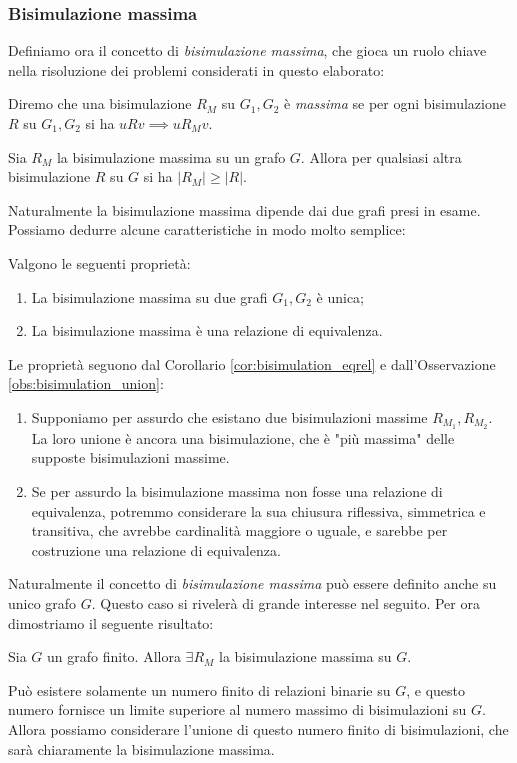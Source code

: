 \subsubsection{Bisimulazione massima}
\label{sec:bisi_max}
Definiamo ora il concetto di \emph{bisimulazione massima}, che gioca un ruolo chiave nella risoluzione dei problemi considerati in questo elaborato:
\begin{definition}
    Diremo che una bisimulazione $R_M$ su $G_1, G_2$ è \emph{massima} se per ogni bisimulazione $R$ su $G_1,G_2$ si ha $u R v \implies u R_M v$.
\end{definition}
\begin{observation}
    Sia $R_M$ la bisimulazione massima su un grafo $G$. Allora per qualsiasi altra bisimulazione $R$ su $G$ si ha $|R_M| \geq |R|$.
\end{observation}
Naturalmente la bisimulazione massima dipende dai due grafi presi in esame. Possiamo dedurre alcune caratteristiche in modo molto semplice:
\begin{proposition}
    Valgono le seguenti proprietà:
    \begin{enumerate}
        \item La bisimulazione massima su due grafi $G_1,G_2$ è unica;
        \item La bisimulazione massima è una relazione di equivalenza.
    \end{enumerate}
    \vspace*{-0.3cm}
    \label{prop:bisi_max_equi}
\end{proposition}
\begin{proof2}
    Le proprietà seguono dal Corollario \ref{cor:bisimulation_eqrel} e dall'Osservazione \ref{obs:bisimulation_union}:
    \begin{enumerate}
        \item Supponiamo per assurdo che esistano due bisimulazioni massime $R_{M_1}, R_{M_2}$. La loro unione è ancora una bisimulazione, che è "più massima" delle supposte bisimulazioni massime.
        \item Se per assurdo la bisimulazione massima non fosse una relazione di equivalenza, potremmo considerare la sua chiusura riflessiva, simmetrica e transitiva, che avrebbe cardinalità maggiore o uguale, e sarebbe per costruzione una relazione di equivalenza.
    \end{enumerate}
    \vspace*{-0.7cm}
\end{proof2}
Naturalmente il concetto di \emph{bisimulazione massima} può essere definito anche su unico grafo $G$. Questo caso si rivelerà di grande interesse nel seguito. Per
ora dimostriamo il seguente risultato:
\begin{theorem}
    Sia $G$ un grafo finito. Allora $\exists R_M$ la bisimulazione massima su $G$.
\end{theorem}
\begin{proof2}
    Può esistere solamente un numero finito di relazioni binarie su $G$, e questo numero fornisce un limite superiore al numero massimo di bisimulazioni su $G$.
    Allora possiamo considerare l'unione di questo numero finito di bisimulazioni, che sarà chiaramente la bisimulazione massima.
\end{proof2}

